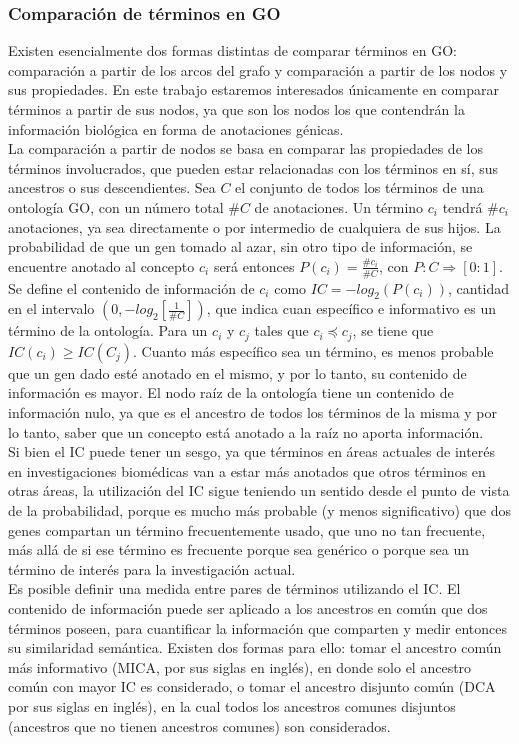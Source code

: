 \subsubsection{Comparación de términos en GO}
Existen esencialmente dos formas distintas de comparar términos en GO: comparación a partir de los arcos del grafo y comparación a partir de los nodos y sus propiedades. En este trabajo estaremos interesados únicamente en comparar términos a partir de sus nodos, ya que son los nodos los que contendrán la información biológica en forma de anotaciones génicas.\\
La comparación a partir de nodos se basa en comparar las propiedades de los términos involucrados, que pueden estar relacionadas con los términos en sí, sus ancestros o sus descendientes. 
Sea $C$ el conjunto de todos los términos de una ontología GO, con un número total $\#C$ de anotaciones. Un término $c_i$ tendrá $\#c_i$ anotaciones, ya sea directamente o por intermedio de cualquiera de sus hijos. La probabilidad de que un gen tomado al azar, sin otro tipo de información, se encuentre anotado al concepto $c_i$ será entonces $P(c_i) = \frac{\#c_i}{\#C}$, con $P:C\Rightarrow [0:1]$.\\
Se define el contenido de información de $c_i$ como $IC = -log_2(P(c_i))$, cantidad en el intervalo $(0, -log_2[\frac{1}{\#C}])$, que indica cuan específico e informativo es un término de la ontología. Para un $c_i$ y $c_j$ tales que $c_i \preceq c_j$, se tiene que $IC(c_i) \geq IC(C_j)$. Cuanto más específico sea un término, es menos probable que un gen dado esté anotado en el mismo, y por lo tanto, su contenido de información es mayor. El nodo raíz de la ontología tiene un contenido de información nulo, ya que es el ancestro de todos los términos de la misma y por lo tanto, saber que un concepto está anotado a la raíz no aporta información.\\
Si bien el IC puede tener un sesgo, ya que términos en áreas actuales de interés en investigaciones biomédicas van a estar más anotados que otros términos en otras áreas, la utilización del IC sigue teniendo un sentido desde el punto de vista de la probabilidad, porque es mucho más probable (y menos significativo) que dos genes compartan un término frecuentemente usado, que uno no tan frecuente, más allá de si ese término es frecuente porque sea genérico o porque sea un término de interés para la investigación actual.\\
Es posible definir una medida entre pares de términos utilizando el IC. El contenido de información puede ser aplicado a los ancestros en común que dos términos poseen, para cuantificar la información que comparten y medir entonces su similaridad semántica. Existen dos formas para ello: tomar el ancestro común más informativo (MICA, por sus siglas en inglés), en donde solo el ancestro común con mayor IC es considerado, o tomar el ancestro disjunto común (DCA por sus siglas en inglés), en la cual todos los ancestros comunes disjuntos (ancestros que no tienen ancestros comunes) son considerados.\\
